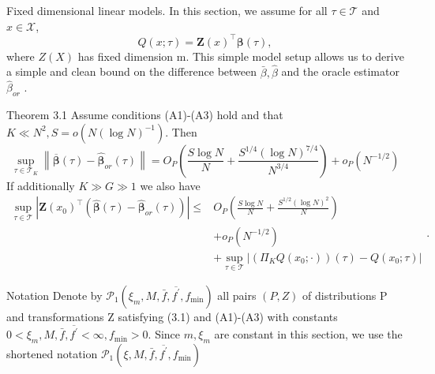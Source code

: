 \documentclass[11pt]{beamer}
\begin{document}
\begin{frame}{Fixed dimensional linear models.}
In this section, we assume for all $\tau\in \mathcal{T}$ and $x \in \mathcal{X}$,
$$
Q(x ; \tau)=\mathbf{Z}(x)^{\top} \boldsymbol{\beta}(\tau),
$$
where $Z(X)$ has fixed dimension m. This simple model setup allows us to
derive a simple and clean bound on the difference between $\bar{\beta},\hat{\beta}$ and the oracle estimator $\hat{\beta}_{or}$ .
\end{frame}
\begin{frame}{Theorem 3.1}
Assume conditions (A1)-(A3) hold and that $K \ll N^2, S=o(N(\log N)^{-1})$. Then
$$
\sup _{\tau \in \mathcal{T}_{K}}\left\|\overline{\boldsymbol{\beta}}(\tau)-\widehat{\boldsymbol{\beta}}_{o r}(\tau)\right\|=O_{P}\left(\frac{S \log N}{N}+\frac{S^{1 / 4}(\log N)^{7 / 4}}{N^{3 / 4}}\right)+o_{P}\left(N^{-1 / 2}\right)
$$
If additionally $
K \gg G \gg 1$ we also have
$$
\begin{aligned}
\sup _{\tau \in \mathcal{T}}\left|\mathbf{Z}\left(x_{0}\right)^{\top}\left(\widehat{\boldsymbol{\beta}}(\tau)-\widehat{\boldsymbol{\beta}}_{o r}(\tau)\right)\right| \leq & O_{P}\left(\frac{S \log N}{N}+\frac{S^{1 / 2}(\log N)^{2}}{N}\right) \\
&+o_{P}\left(N^{-1 / 2}\right)\\
&+\sup _{\tau \in \mathcal{T}}\left|\left(\Pi_{K} Q\left(x_{0} ; \cdot\right)\right)(\tau)-Q\left(x_{0} ; \tau\right)\right|
\end{aligned}.
$$
\end{frame}


\begin{frame}{Notation}
Denote by $\mathcal{P}_{1}\left(\xi_{m}, M, \bar{f}, \overline{f^{\prime}}, f_{\min }\right)$ all pairs $(P,Z)$ of distributions P and transformations Z satisfying (3.1) and (A1)-(A3) with constants $0<\xi_{m}, M, \bar{f}, \overline{f^{\prime}}<\infty, f_{\min }>0$.
Since $m, \xi_m$ are constant in this
section, we use the shortened notation $\mathcal{P}_{1}\left(\xi, M, \bar{f}, \overline{f^{\prime}}, f_{\min }\right)$
\end{frame}
\end{document}
